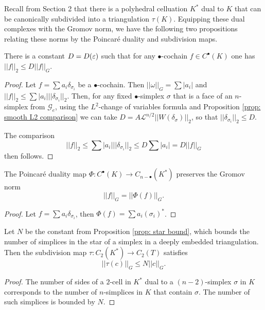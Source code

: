 Recall from Section 2 that there is a polyhedral celluation $K^*$ dual to $K$ that can be canonically subdivided into a triangulation $\tau(K)$. Equipping these dual complexes with the Gromov norm, we have the following two propositions relating these norms by the Poincar\'e duality and subdivision maps.

\begin{prop} \label{prop: 3.2} 
There is a constant $D = D(\varepsilon)$ such that for any $\bullet$-cochain $f\in C^{\bullet}(K)$ one has $||f||_2 \leq D||f||_G$.
\end{prop}

\begin{proof} Let $f = \sum a_i\delta_{\sigma_i}$ be a $\bullet$-cochain. Then $||\omega||_G = \sum|a_i|$ and $||f||_2 \leq \sum |a_i| ||\delta_{\sigma_i}||_2.$ Then, for any fixed $\bullet$-simplex $\sigma$ that is a face of an $n$-simplex from $\mathcal G_e$, using the $L^2$-change of variables formula and Proposition \ref{prop: smooth L2 comparison} we can take $D = A\mathcal L^{n/2}||W(\delta_{\sigma})||_2$, so that $||\delta_{\sigma_i}||_2 \leq D.$

The comparison \[||f||_2\leq\sum |a_i| ||\delta_{\sigma_i}||_2 \leq D\sum |a_i| = D||f||_G \] then follows.
\end{proof}


\begin{prop} \label{prop: 3.3} 
The Poincar\'e duality map $\Phi:C^{\bullet}(K)\to C_{n-\bullet}(K^*)$ preserves the Gromov norm $$||f||_G= ||\Phi(f)||_G.$$
\end{prop}

\begin{proof}
  Let $f = \sum a_i\delta_{\sigma_i}$, then $\Phi(f) = \sum a_i (\sigma_i)^*$.
\end{proof}

\begin{prop} \label{prop: 3.4} 
Let $N$ be the constant from Proposition \ref{prop: star bound}, which bounds the number of simplices in the star of a simplex in a deeply embedded triangulation. Then the subdivision map $\tau: C_{2}(K^*)\to C_{2}(T)$ satisfies $$ || \tau(c)||_G \leq N ||c||_G.$$
\end{prop}

\begin{proof}
  The number of sides of a $2$-cell in $K^*$ dual to a $(n-2)$-simplex $\sigma$ in $K$ corresponds to the number of $n$-simplices in $K$ that contain $\sigma$. The number of such simplices is bounded by $N$.
\end{proof}

